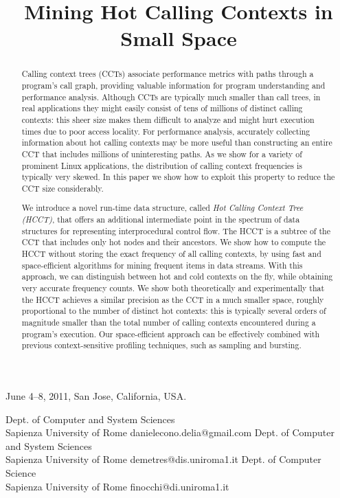 \documentclass{sigplanconf}
\begin{document}
 {June 4--8, 2011, San Jose, California, USA.}

\title{Mining Hot Calling Contexts in Small Space}

            {Dept. of Computer and System Sciences\\Sapienza University of Rome}
            {danielecono.delia@gmail.com}
            {Dept. of Computer and System Sciences\\Sapienza University of Rome}
            {demetres@dis.uniroma1.it}
            {Dept. of Computer Science\\Sapienza University of Rome}
            {finocchi@di.uniroma1.it}

\maketitle


\begin{abstract}
Calling context trees (CCTs) associate performance metrics with paths through a program's call graph, providing valuable information for program understanding and performance analysis. Although CCTs are typically much smaller than call trees, in real applications they might easily consist of tens of millions of distinct calling contexts: this sheer size makes them difficult to analyze and might hurt execution times due to poor access locality. For performance analysis, accurately collecting information about hot calling contexts may be more useful than constructing an entire CCT that includes millions of uninteresting paths. As we show for a variety of prominent Linux applications, the distribution of calling context frequencies is typically very skewed. In this paper we show how to exploit this property to reduce the CCT size considerably.

We introduce a novel run-time data structure, called {\em Hot Calling Context Tree (HCCT)}, that offers an additional intermediate point in the spectrum of data structures for representing interprocedural control flow. The HCCT is a subtree of the CCT that includes only hot nodes and their ancestors. We show how to compute the HCCT without storing the exact frequency of all calling contexts, by using fast and space-efficient algorithms for mining frequent items in data streams. With this approach, we can distinguish between hot and cold contexts on the fly, while obtaining very accurate frequency counts. We show both theoretically and experimentally that the HCCT achieves a similar precision as the CCT in a much smaller space, roughly proportional to the number of distinct hot contexts: this is typically several orders of magnitude smaller than the total number of calling contexts encountered during a program's execution. Our space-efficient approach can be effectively combined with previous context-sensitive profiling techniques, such as sampling and bursting.
\end{abstract}
\end{document}
